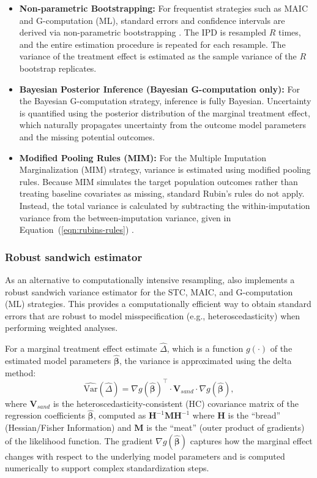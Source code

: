 \documentclass[article]{jss}
\begin{document}
\begin{itemize}
    \item \textbf{Non-parametric Bootstrapping:} For frequentist strategies such as MAIC and G-computation (ML), standard errors and confidence intervals are derived via non-parametric bootstrapping \citep{efron1979bootstrap}. The IPD is resampled $R$ times, and the entire estimation procedure is repeated for each resample. The variance of the treatment effect is estimated as the sample variance of the $R$ bootstrap replicates.
    
    \item \textbf{Bayesian Posterior Inference (Bayesian G-computation only):} For the Bayesian G-computation strategy, inference is fully Bayesian. Uncertainty is quantified using the posterior distribution of the marginal treatment effect, which naturally propagates uncertainty from the outcome model parameters and the missing potential outcomes.
    
    \item \textbf{Modified Pooling Rules (MIM):} For the Multiple Imputation Marginalization (MIM) strategy, variance is estimated using modified pooling rules. Because MIM simulates the target population outcomes rather than treating baseline covariates as missing, standard Rubin's rules do not apply. Instead, the total variance is calculated by subtracting the within-imputation variance from the between-imputation variance, given in Equation~(\ref{eqn:rubins-rules}) \citep{rubin1987}.
\end{itemize}

\subsubsection{Robust sandwich estimator} \label{sec:variance_methods}
As an alternative to computationally intensive resampling,  also implements a robust sandwich variance estimator for the STC, MAIC, and G-computation (ML) strategies. This provides a computationally efficient way to obtain standard errors that are robust to model misspecification (e.g., heteroscedasticity) when performing weighted analyses.

For a marginal treatment effect estimate $\hat{\Delta}$, which is a function $g(\cdot)$ of the estimated model parameters $\hat{\boldsymbol{\beta}}$, the variance is approximated using the delta method:
\begin{equation}
\widehat{\text{Var}}(\hat{\Delta}) = \nabla g(\hat{\boldsymbol{\beta}})^\top \cdot \mathbf{V}_{sand} \cdot \nabla g(\hat{\boldsymbol{\beta}}),
\end{equation}
where $\mathbf{V}_{sand}$ is the heteroscedasticity-consistent (HC) covariance matrix of the regression coefficients $\hat{\boldsymbol{\beta}}$, computed as $\mathbf{H}^{-1} \mathbf{M} \mathbf{H}^{-1}$ where $\mathbf{H}$ is the ``bread'' (Hessian/Fisher Information) and $\mathbf{M}$ is the ``meat'' (outer product of gradients) of the likelihood function. The gradient $\nabla g(\hat{\boldsymbol{\beta}})$ captures how the marginal effect changes with respect to the underlying model parameters and is computed numerically to support complex standardization steps.
\end{document}
